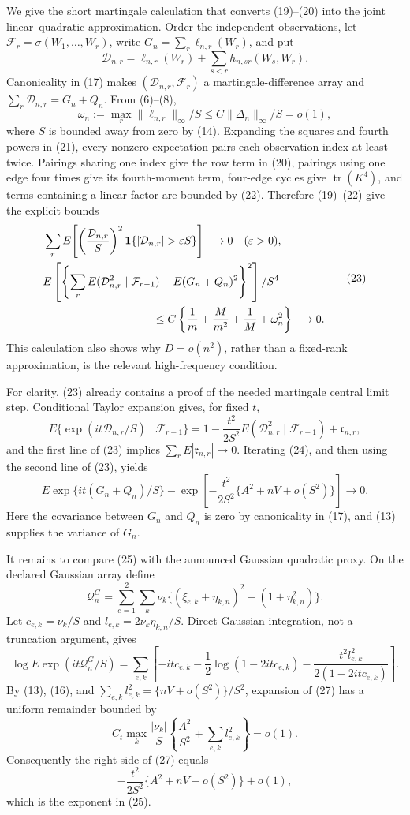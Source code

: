 We give the short martingale calculation that converts (19)--(20) into the joint linear--quadratic approximation.  Order the independent observations, let \(\mathcal F_r=\sigma(W_1,\ldots,W_r)\), write \(G_n=\sum_r\ell_{n,r}(W_r)\), and put
\[
\mathcal D_{n,r}=\ell_{n,r}(W_r)+\sum_{s<r}h_{n,sr}(W_s,W_r).
\tag{21}
\]
Canonicality in (17) makes \((\mathcal D_{n,r},\mathcal F_r)\) a martingale-difference array and \(\sum_r\mathcal D_{n,r}=G_n+Q_n\).  From (6)--(8),
\[
\omega_n:=\max_r\|\ell_{n,r}\|_\infty/S\le C\|\Delta_n\|_\infty/S=o(1),
\tag{22}
\]
where \(S\) is bounded away from zero by (14).  Expanding the squares and fourth powers in (21), every nonzero expectation pairs each observation index at least twice.  Pairings sharing one index give the row term in (20), pairings using one edge four times give its fourth-moment term, four-edge cycles give \(\operatorname{tr}(K^4)\), and terms containing a linear factor are bounded by (22).  Therefore (19)--(22) give the explicit bounds
\[
\begin{split}
&\sum_r E\!\left[\left(\frac{\mathcal D_{n,r}}S\right)^2
\mathbf 1\{|\mathcal D_{n,r}|>\varepsilon S\}\right]\longrightarrow0\quad(\varepsilon>0),\\
&E\left[\left\{\sum_rE(\mathcal D_{n,r}^2\mid\mathcal F_{r-1})
-E(G_n+Q_n)^2\right\}^2\right]/S^4\\
&\hspace{35mm}\le C\left\{\frac1m+\frac{M}{m^2}+\frac1M+\omega_n^2\right\}\longrightarrow0.
\end{split}
\tag{23}
\]
This calculation also shows why \(D=o(n^2)\), rather than a fixed-rank approximation, is the relevant high-frequency condition.

For clarity, (23) already contains a proof of the needed martingale central limit step.  Conditional Taylor expansion gives, for fixed \(t\),
\[
E\{\exp(it\mathcal D_{n,r}/S)\mid\mathcal F_{r-1}\}
=1-\frac{t^2}{2S^2}E(\mathcal D_{n,r}^2\mid\mathcal F_{r-1})+\mathfrak r_{n,r},
\tag{24}
\]
and the first line of (23) implies \(\sum_rE|\mathfrak r_{n,r}|\to0\).  Iterating (24), and then using the second line of (23), yields
\[
E\exp\{it(G_n+Q_n)/S\}
-\exp\left[-\frac{t^2}{2S^2}\{A^2+nV+o(S^2)\}\right]\longrightarrow0.
\tag{25}
\]
Here the covariance between \(G_n\) and \(Q_n\) is zero by canonicality in (17), and (13) supplies the variance of \(G_n\).

It remains to compare (25) with the announced Gaussian quadratic proxy.  On the declared Gaussian array define
\[
\mathcal Q_n^G=\sum_{e=1}^2\sum_k
\nu_k\{(\xi_{e,k}+\eta_{k,n})^2-(1+\eta_{k,n}^2)\}.
\tag{26}
\]
Let \(c_{e,k}=\nu_k/S\) and \(l_{e,k}=2\nu_k\eta_{k,n}/S\).  Direct Gaussian integration, not a truncation argument, gives
\[
\log E\exp(it\mathcal Q_n^G/S)
=\sum_{e,k}\left[-itc_{e,k}-\frac12\log(1-2itc_{e,k})
-\frac{t^2l_{e,k}^2}{2(1-2itc_{e,k})}\right].
\tag{27}
\]
By (13), (16), and \(\sum_{e,k}l_{e,k}^2=\{nV+o(S^2)\}/S^2\), expansion of (27) has a uniform remainder bounded by
\[
C_t\max_k\frac{|\nu_k|}{S}\left\{\frac{A^2}{S^2}+\sum_{e,k}l_{e,k}^2\right\}=o(1).
\tag{28}
\]
Consequently the right side of (27) equals
\[
-\frac{t^2}{2S^2}\{A^2+nV+o(S^2)\}+o(1),
\tag{29}
\]
which is the exponent in (25).

